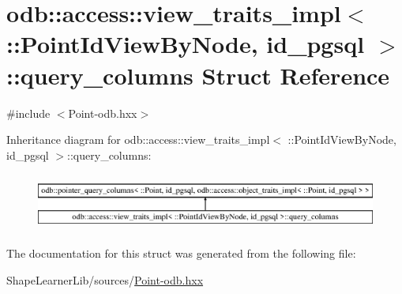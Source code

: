 \hypertarget{structodb_1_1access_1_1view__traits__impl_3_01_1_1_point_id_view_by_node_00_01id__pgsql_01_4_1_1query__columns}{}\section{odb\+:\+:access\+:\+:view\+\_\+traits\+\_\+impl$<$ \+:\+:Point\+Id\+View\+By\+Node, id\+\_\+pgsql $>$\+:\+:query\+\_\+columns Struct Reference}
\label{structodb_1_1access_1_1view__traits__impl_3_01_1_1_point_id_view_by_node_00_01id__pgsql_01_4_1_1query__columns}


{\ttfamily \#include $<$Point-\/odb.\+hxx$>$}

Inheritance diagram for odb\+:\+:access\+:\+:view\+\_\+traits\+\_\+impl$<$ \+:\+:Point\+Id\+View\+By\+Node, id\+\_\+pgsql $>$\+:\+:query\+\_\+columns\+:\begin{figure}[H]
\begin{center}
\leavevmode
\includegraphics[height=1.921098cm]{d6/d9b/structodb_1_1access_1_1view__traits__impl_3_01_1_1_point_id_view_by_node_00_01id__pgsql_01_4_1_1query__columns}
\end{center}
\end{figure}


The documentation for this struct was generated from the following file\+:\begin{DoxyCompactItemize}
\item 
Shape\+Learner\+Lib/sources/\hyperlink{_point-odb_8hxx}{Point-\/odb.\+hxx}\end{DoxyCompactItemize}
